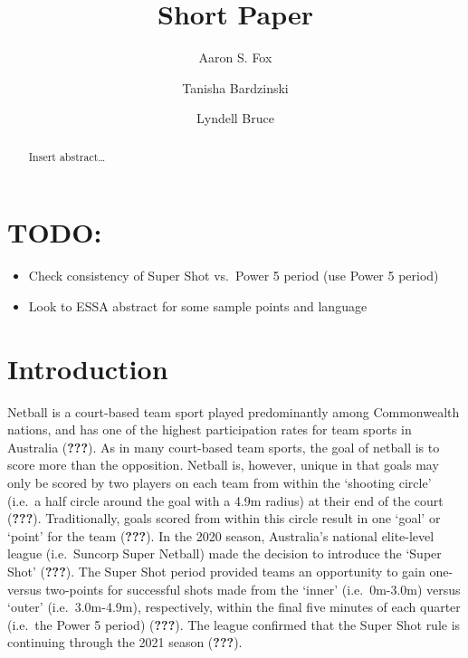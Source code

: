 \documentclass[]{elsarticle} %
\providecommand{\tightlist}{%
  \setlength{\itemsep}{0pt}\setlength{\parskip}{0pt}}
\begin{document}
\begin{frontmatter}

  \title{Short Paper}
    \author[Centre for Sport Research]{Aaron S. Fox}
  
    \author[Centre for Sport Research]{Tanisha Bardzinski}
  
    \author[Centre for Sport Research]{Lyndell Bruce}
  
      \address[Centre for Sport Research]{Centre for Sport Research,
School of Exercise and Nutrition Sciences, Deakin University, Geelong,
Australia}
  
  \begin{abstract}
  Insert abstract\ldots{}
  \end{abstract}
  
 \end{frontmatter}

\hypertarget{todo}{%
\section{TODO:}\label{todo}}

\begin{itemize}
\tightlist
\item
  Check consistency of Super Shot vs.~Power 5 period (use Power 5
  period)
\item
  Look to ESSA abstract for some sample points and language
\end{itemize}

\hypertarget{introduction}{%
\section{Introduction}\label{introduction}}

Netball is a court-based team sport played predominantly among
Commonwealth nations, and has one of the highest participation rates for
team sports in Australia ({\textbf{???}}). As in many court-based team
sports, the goal of netball is to score more than the opposition.
Netball is, however, unique in that goals may only be scored by two
players on each team from within the `shooting circle' (i.e.~a half
circle around the goal with a 4.9m radius) at their end of the court
({\textbf{???}}). Traditionally, goals scored from within this circle
result in one `goal' or `point' for the team ({\textbf{???}}). In the
2020 season, Australia's national elite-level league (i.e.~Suncorp Super
Netball) made the decision to introduce the `Super Shot'
({\textbf{???}}). The Super Shot period provided teams an opportunity to
gain one- versus two-points for successful shots made from the `inner'
(i.e.~0m-3.0m) versus `outer' (i.e.~3.0m-4.9m), respectively, within the
final five minutes of each quarter (i.e.~the Power 5 period)
({\textbf{???}}). The league confirmed that the Super Shot rule is
continuing through the 2021 season ({\textbf{???}}).
\end{document}
